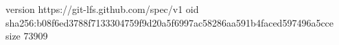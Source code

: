 version https://git-lfs.github.com/spec/v1
oid sha256:b08f6ed3788f7133304759f9d20a5f6997ac58286aa591b4faced597496a5cce
size 73909
